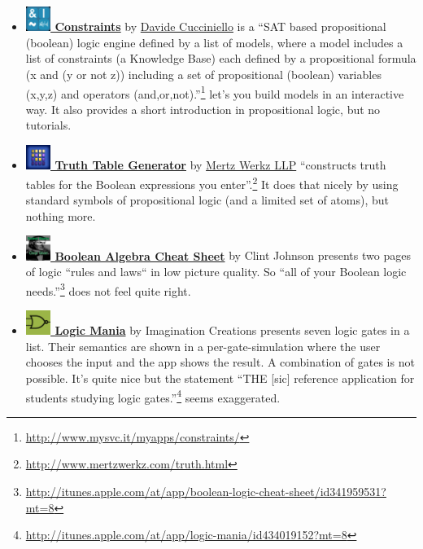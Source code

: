 \begin{itemize}

\item  \href{http://itunes.apple.com/at/app/constraints/id418722652?mt=8}{\bf 
\includegraphics[width=0.8cm]{related/Constraints.png} Constraints}
by 
\href{http://www.mysvc.it/myapps/constraints/}{Davide Cucciniello} 
is a “SAT based propositional (boolean) logic engine defined by a list of models, 
where a model includes a list of constraints (a Knowledge Base) 
each defined by a propositional formula (x and (y or not z)) 
including a set of propositional (boolean) variables (x,y,z) 
and operators (and,or,not).”\footnote{
\url{http://www.mysvc.it/myapps/constraints/}} 
let's you build models in an interactive way. It also provides a short introduction in propositional logic, but no tutorials.


\item \href{http://itunes.apple.com/at/app/truth-table-generator/id507190346?mt=8}{\bf 
\includegraphics[width=0.8cm]{related/TruthTables.png} Truth Table Generator} 
by
\href{http://www.mertzwerkz.com/truth.html}{Mertz Werkz LLP}    
“constructs truth tables for the Boolean expressions you enter”.\footnote{
\url{http://www.mertzwerkz.com/truth.html}}
It does that nicely by using standard symbols of propositional logic (and a limited set of atoms), but nothing more.

\item
\href{http://itunes.apple.com/at/app/boolean-logic-cheat-sheet/id341959531?mt=8}{\bf 
\includegraphics[width=0.8cm]{related/CheatSheet.png} Boolean Algebra Cheat Sheet} 
by 
{Clint Johnson} presents two pages of logic “rules and laws“ in low picture quality. So “all of your Boolean 
logic needs.”\footnote{
\url{http://itunes.apple.com/at/app/boolean-logic-cheat-sheet/id341959531?mt=8}} 
does not feel quite right.

\item
\href{http://itunes.apple.com/at/app/logic-mania/id434019152?mt=8}{\bf 
\includegraphics[width=0.8cm]{related/LogicMania.png} Logic Mania} 
by 
{Imagination Creations} presents seven logic gates in a list. 
Their semantics are shown in a per-gate-simulation where the user chooses the input and the app shows the result. 
A combination of gates is not possible. It's quite nice but the statement “THE [sic] reference application for students 
studying logic gates.”\footnote{
\url{http://itunes.apple.com/at/app/logic-mania/id434019152?mt=8}}
seems exaggerated.


\end{itemize}

